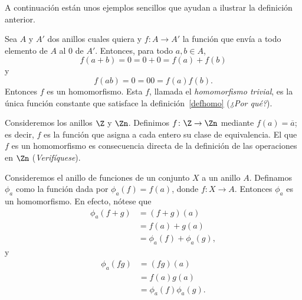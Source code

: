 A continuación están unos ejemplos sencillos que ayudan a ilustrar la definición anterior.
\begin{ejem}
	Sea $A$ y $A'$ dos anillos cuales quiera y $f\colon A\to A'$ la función que envía a todo elemento de $A$ al $0$ de $A'$. Entonces, para todo $a,b\in A$,
	\[ f(a+b) = 0 = 0+0 = f(a) + f(b) \]
	y
	\[ f(ab) = 0 = 00 = f(a)f(b). \]
	Entonces $f$ es un homomorfismo. Esta $f$, llamada el \textit{homomorfismo trivial}, es la única función constante que satisface la definición~\ref{defhomo} (\textit{¿Por qué?}).
\end{ejem} 
\begin{ejem}
	Consideremos los anillos $\Z$ y $\Zn$. Definimos $f\colon  \Z \to \Zn$ mediante $f(a) = \overline{a}$; es decir, $f$ es la función que asigna a cada entero su clase de equivalencia. El que $f$ es un homomorfismo es consecuencia directa de la definición de las operaciones en $\Zn$ (\textit{Verifíquese}).
\end{ejem} 
\begin{ejem}
	Consideremos el anillo de funciones de un conjunto $X$ a un anillo $A$. Definamos $\phi_a$ como la función dada por $\phi_a(f) = f(a)$, donde $f\colon X\to A$. Entonces $\phi_a$ es un homomorfismo. En efecto, nótese que
	\begin{align*}
		\phi_a(f+g) &= (f+g)(a) \\
				    &= f(a) + g(a) \\
				    &= \phi_a(f) + \phi_a(g),
	\end{align*}
	y 
	\begin{align*}
		\phi_a(fg) &= (fg)(a) \\
				   &= f(a)g(a) \\
				   &= \phi_a(f)\phi_a(g).
	\end{align*}
\end{ejem} 

